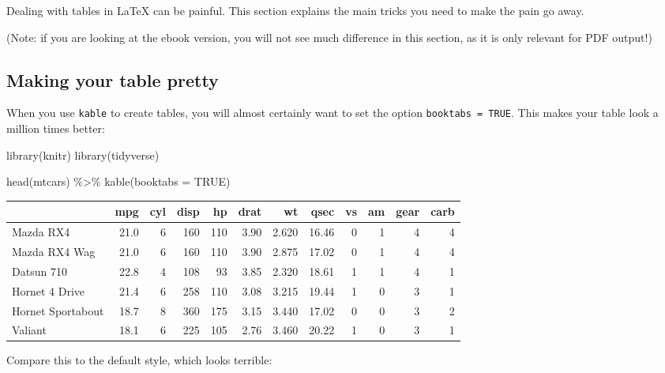 \documentclass[a4paper, nobind]{templates/ociamthesis}
\newenvironment{Shaded}{\begin{snugshade}}{\end{snugshade}}
\newcommand{\AttributeTok}[1]{\textcolor[rgb]{0.77,0.63,0.00}{#1}}
\newcommand{\ConstantTok}[1]{\textcolor[rgb]{0.00,0.00,0.00}{#1}}
\newcommand{\FunctionTok}[1]{\textcolor[rgb]{0.00,0.00,0.00}{#1}}
\newcommand{\NormalTok}[1]{#1}
\newcommand{\SpecialCharTok}[1]{\textcolor[rgb]{0.00,0.00,0.00}{#1}}
\renewenvironment{Shaded}
{
  \vspace{10pt}%
  \begin{snugshade}%
}{%
  \end{snugshade}%
  \vspace{8pt}%
}
\begin{document}
Dealing with tables in LaTeX can be painful.
This section explains the main tricks you need to make the pain go away.

(Note: if you are looking at the ebook version, you will not see much difference in this section, as it is only relevant for PDF output!)

\hypertarget{making-your-table-pretty}{%
\subsection{Making your table pretty}\label{making-your-table-pretty}}

When you use \texttt{kable} to create tables, you will almost certainly want to set the option \texttt{booktabs\ =\ TRUE}.
This makes your table look a million times better:

\begin{Shaded}
\begin{Highlighting}[]
\FunctionTok{library}\NormalTok{(knitr)}
\FunctionTok{library}\NormalTok{(tidyverse)}

\FunctionTok{head}\NormalTok{(mtcars) }\SpecialCharTok{\%\textgreater{}\%} 
  \FunctionTok{kable}\NormalTok{(}\AttributeTok{booktabs =} \ConstantTok{TRUE}\NormalTok{)}
\end{Highlighting}
\end{Shaded}

\begin{tabular}{lrrrrrrrrrrr}
\toprule
  & mpg & cyl & disp & hp & drat & wt & qsec & vs & am & gear & carb\\
\midrule
Mazda RX4 & 21.0 & 6 & 160 & 110 & 3.90 & 2.620 & 16.46 & 0 & 1 & 4 & 4\\
Mazda RX4 Wag & 21.0 & 6 & 160 & 110 & 3.90 & 2.875 & 17.02 & 0 & 1 & 4 & 4\\
Datsun 710 & 22.8 & 4 & 108 & 93 & 3.85 & 2.320 & 18.61 & 1 & 1 & 4 & 1\\
Hornet 4 Drive & 21.4 & 6 & 258 & 110 & 3.08 & 3.215 & 19.44 & 1 & 0 & 3 & 1\\
Hornet Sportabout & 18.7 & 8 & 360 & 175 & 3.15 & 3.440 & 17.02 & 0 & 0 & 3 & 2\\
\addlinespace
Valiant & 18.1 & 6 & 225 & 105 & 2.76 & 3.460 & 20.22 & 1 & 0 & 3 & 1\\
\bottomrule
\end{tabular}

\vspace{4mm}

Compare this to the default style, which looks terrible:
\end{document}
